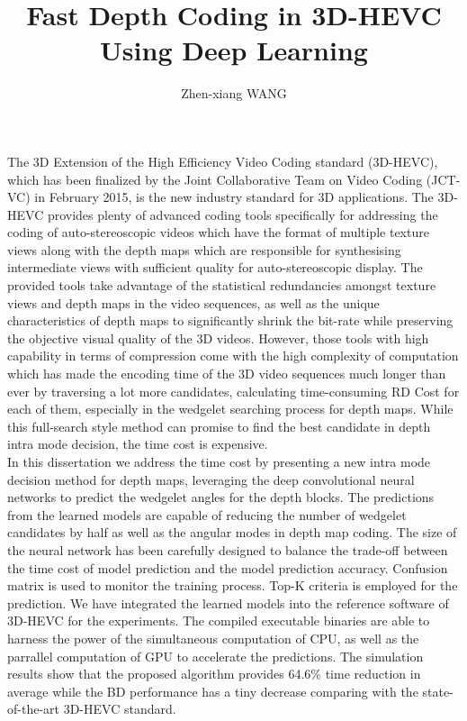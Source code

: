 \documentclass{report}
\begin{document}
    \title{Fast Depth Coding in 3D-HEVC\\
    Using Deep Learning}
    \author{Zhen-xiang WANG}
    \beforepreface
    The 3D Extension of the High Efficiency Video Coding standard (3D-HEVC),
    which has been finalized by the Joint Collaborative Team on Video Coding
    (JCT-VC) in February 2015, is the new industry standard for 3D applications.
    The 3D-HEVC provides plenty of advanced coding tools specifically
    for addressing the coding of auto-stereoscopic videos which have the format
    of multiple texture views along with the depth maps which are responsible
    for synthesising intermediate views with sufficient quality for
    auto-stereoscopic display.
    The provided tools take advantage of the statistical redundancies amongst
    texture views and depth maps in the video sequences, as well as the unique
    characteristics of depth maps to significantly shrink the bit-rate
    while preserving the objective visual quality of the
    3D videos.
    However, those tools with high capability in terms of compression come
    with the high complexity of computation which has made the encoding time
    of the 3D video sequences much longer than ever by traversing a lot more
    candidates, calculating time-consuming RD Cost for each of them,
    especially in the wedgelet searching process for depth maps.
    While this full-search style method can promise to find the best
    candidate in depth intra mode decision, the time cost is expensive.\\
    \newline
    In this dissertation we address the time cost by presenting a new
    intra mode decision method for depth maps, leveraging the deep
    convolutional neural networks to predict the wedgelet angles
    for the depth blocks.
    The predictions from the learned models are capable of
    reducing the number of wedgelet candidates by half as well as the
    angular modes in depth map coding.
    The size of the neural network has been carefully designed to balance
    the trade-off between the time cost of model prediction and the model prediction
    accuracy.
    Confusion matrix is used to monitor the training process.
    Top-K criteria is employed for the prediction.
    We have integrated the learned models into the reference software of
    3D-HEVC for the experiments.
    The compiled executable binaries are able to harness
    the power of the simultaneous computation of CPU, as well as
    the parrallel computation of GPU to accelerate the predictions.
    The simulation results show that the proposed algorithm
    provides 64.6\% time reduction in average while the
    BD performance has a tiny decrease comparing with the state-of-the-art 3D-HEVC
    standard.
\end{document}
